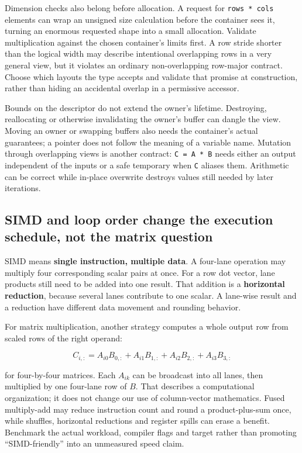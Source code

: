 Dimension checks also belong before allocation. A request for \texttt{rows\ *\ cols} elements can wrap an unsigned size calculation before the container sees it, turning an enormous requested shape into a small allocation. Validate multiplication against the chosen container's limits first. A row stride shorter than the logical width may describe intentional overlapping rows in a very general view, but it violates an ordinary non-overlapping row-major contract. Choose which layouts the type accepts and validate that promise at construction, rather than hiding an accidental overlap in a permissive accessor.

Bounds on the descriptor do not extend the owner's lifetime. Destroying, reallocating or otherwise invalidating the owner's buffer can dangle the view. Moving an owner or swapping buffers also needs the container's actual guarantees; a pointer does not follow the meaning of a variable name. Mutation through overlapping views is another contract: \texttt{C\ =\ A\ *\ B} needs either an output independent of the inputs or a safe temporary when \texttt{C} aliases them. Arithmetic can be correct while in-place overwrite destroys values still needed by later iterations.

\subsection{SIMD and loop order change the execution schedule, not the matrix question}\label{simd-and-loop-order-change-the-execution-schedule-not-the-matrix-question}

SIMD means \textbf{single instruction, multiple data}. A four-lane operation may multiply four corresponding scalar pairs at once. For a row dot vector, lane products still need to be added into one result. That addition is a \textbf{horizontal reduction}, because several lanes contribute to one scalar. A lane-wise result and a reduction have different data movement and rounding behavior.

For matrix multiplication, another strategy computes a whole output row from scaled rows of the right operand:

\[
C_{i,:}=A_{i0}B_{0,:}+A_{i1}B_{1,:}+A_{i2}B_{2,:}+A_{i3}B_{3,:}
\]

for four-by-four matrices. Each \(A_{ik}\) can be broadcast into all lanes, then multiplied by one four-lane row of \(B\). That describes a computational organization; it does not change our use of column-vector mathematics. Fused multiply-add may reduce instruction count and round a product-plus-sum once, while shuffles, horizontal reductions and register spills can erase a benefit. Benchmark the actual workload, compiler flags and target rather than promoting ``SIMD-friendly'' into an unmeasured speed claim.

